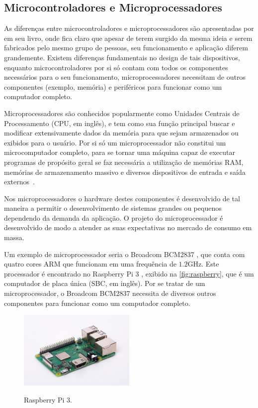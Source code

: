 \subsection{Microcontroladores e Microprocessadores}%

As diferenças entre microcontroladores e microprocessadores são apresentadas por  em seu livro, onde fica claro que apesar de terem surgido da mesma ideia e serem fabricados pelo mesmo grupo de pessoas, seu funcionamento e aplicação diferem grandemente. Existem diferenças fundamentais no design de tais dispositivos, enquanto microcontroladores por si só contam com todos os componentes necessários para o seu funcionamento, microprocessadores necessitam de outros componentes (exemplo, memória) e periféricos para funcionar como um computador completo.

Microprocessadores são conhecidos popularmente como Unidades Centrais de Processamento (CPU, em inglês), e tem como sua função principal buscar e modificar extensivamente dados da memória para que sejam armazenados ou exibidos para o usuário. Por si só um microprocessador não constitui um microcomputador completo, para se tornar uma máquina capaz de executar programas de propósito geral se faz necessária a utilização de memórias RAM, memórias de armazenamento massivo e diversos dispositivos de entrada e saída externos~\cite{ayala:1991}.

Nos microprocessadores o hardware destes componentes é desenvolvido de tal maneira a permitir o desenvolvimento de sistemas grandes ou pequenos dependendo da demanda da aplicação. O projeto do microprocessador é desenvolvido de modo a atender as suas expectativas no mercado de consumo em massa.  

Um exemplo de microprocessador seria o Broadcom BCM2837 \cite{raspberry_bcm}, que conta com quatro cores ARM que funcionam em uma frequência de $1.2$GHz. Este processador é encontrado no Raspberry Pi 3 \cite{raspberry:pi3}, exibido na \autoref{fig:raspberry}, que é um computador de placa única (SBC, em inglês). Por se tratar de um microprocessador, o Broadcom BCM2837 necessita de diversos outros componentes para funcionar como um computador completo.

\begin{figure}[ht]
    \centering
    \caption{Raspberry Pi 3.}
    \includegraphics[width=0.5\textwidth, keepaspectratio]{resources/rasp.jpg}
    \label{fig:raspberry}
\end{figure}


